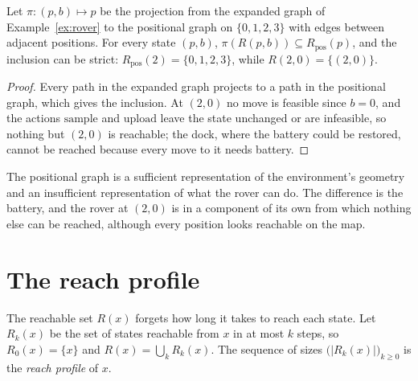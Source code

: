 \begin{newresult}\label{prop:projection}
Let $\pi:(p,b)\mapsto p$ be the projection from the expanded graph of Example~\ref{ex:rover} to the positional graph on $\{0,1,2,3\}$ with edges between adjacent positions. For every state $(p,b)$, $\pi(R(p,b))\subseteq R_{\mathrm{pos}}(p)$, and the inclusion can be strict: $R_{\mathrm{pos}}(2)=\{0,1,2,3\}$, while $R(2,0)=\{(2,0)\}$.
\end{newresult}
\begin{proof}
Every path in the expanded graph projects to a path in the positional graph, which gives the inclusion. At $(2,0)$ no move is feasible since $b=0$, and the actions $\mathrm{sample}$ and $\mathrm{upload}$ leave the state unchanged or are infeasible, so nothing but $(2,0)$ is reachable; the dock, where the battery could be restored, cannot be reached because every move to it needs battery.
\end{proof}

The positional graph is a sufficient representation of the environment's geometry and an insufficient representation of what the rover can do. The difference is the battery, and the rover at $(2,0)$ is in a component of its own from which nothing else can be reached, although every position looks reachable on the map.


\section{The reach profile}\label{sec:profile}

The reachable set $R(x)$ forgets how long it takes to reach each state. Let $R_k(x)$ be the set of states reachable from $x$ in at most $k$ steps, so $R_0(x)=\{x\}$ and $R(x)=\bigcup_kR_k(x)$. The sequence of sizes $\bigl(|R_k(x)|\bigr)_{k\ge0}$ is the \emph{reach profile} of $x$.

